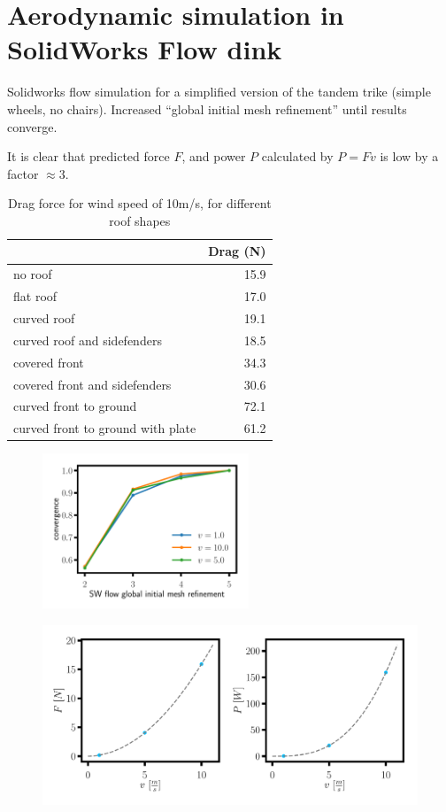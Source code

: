 \documentclass[11pt]{article}
\begin{document}
\section*{Aerodynamic simulation in SolidWorks Flow dink}

Solidworks flow simulation for a simplified version of the tandem trike (simple wheels, no chairs).
Increased ``global initial mesh refinement'' until results converge.

It is clear that predicted force $F$, and power $P$ calculated by $P = F v$ is low by a factor $\approx 3$. 

\begin{table}[h!]
\centering
\begin{tabular}{ | l | r | }
\hline
  & Drag (N) \\ \hline
 no roof & 15.9   \\
 flat roof & 17.0 \\
 curved roof & 19.1 \\
 curved roof and sidefenders & 18.5 \\
 covered front & 34.3 \\
 covered front and sidefenders & 30.6 \\
 curved front to ground & 72.1 \\  
 curved front to ground with plate & 61.2 \\ \hline
\end{tabular}
\caption{Drag force for wind speed of 10m/s, for different roof shapes}
\end{table}

\begin{figure}[h!]
\centering
\includegraphics[width=0.55\textwidth]{convergence.pdf}
\end{figure}

\begin{figure}[h!]
\centering
\includegraphics[width=\textwidth]{ForcePower.pdf}
\end{figure}
\end{document}
